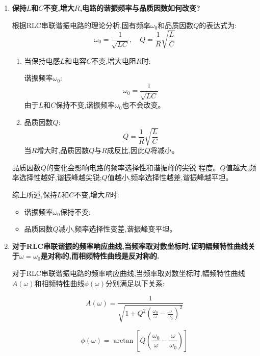\documentclass[UTF8]{ctexart}
\begin{document}
\begin{enumerate}
    \item \textbf{保持$L$和$C$不变,增大$R$,电路的谐振频率与品质因数如何改变?}
    
    根据RLC串联谐振电路的理论分析,固有频率$\omega_0$和品质因数$Q$的表达式为:
    \begin{equation}
    \omega_0 = \frac{1}{\sqrt{LC}}, \quad Q = \frac{1}{R}\sqrt{\frac{L}{C}}
    \end{equation}
    \begin{enumerate}
    \item 当保持电感$L$和电容$C$不变,增大电阻$R$时:

    谐振频率$\omega_0$:
    \begin{equation}
    \omega_0 = \frac{1}{\sqrt{LC}}
    \end{equation}
    由于$L$和$C$保持不变,谐振频率$\omega_0$也不会改变。

    \item 品质因数$Q$:
    \begin{equation}
    Q = \frac{1}{R}\sqrt{\frac{L}{C}}
    \end{equation}
    当$R$增大时,品质因数$Q$与$R$成反比,因此$Q$将减小。
    \end{enumerate}
    品质因数$Q$的变化会影响电路的频率选择性和谐振峰的尖锐  程度。$Q$值越大,频率选择性越好,谐振峰越尖锐;$Q$值越小,频率选择性越差,谐振峰越平坦。

    综上所述,保持$L$和$C$不变,增大$R$时:
    \begin{itemize}
    \item 谐振频率$\omega_0$保持不变;
    \item 品质因数$Q$减小,频率选择性变差,谐振峰变平坦。
    \end{itemize}
    
    \item \textbf{对于RLC串联谐振的频率响应曲线,当频率取对数坐标时,证明幅频特性曲线关于$\omega=\omega_0$是对称的,而相频特性曲线是反对称的.}
    
    对于RLC串联谐振电路的频率响应曲线,当频率取对数坐标时,幅频特性曲线$A(\omega)$和相频特性曲线$\phi(\omega)$分别满足以下关系:

\begin{equation}
A(\omega) = \frac{1}{\sqrt{1 + Q^2(\frac{\omega_0}{\omega} - \frac{\omega}{\omega_0})^2}}
\end{equation}

\begin{equation}
\phi(\omega) = \arctan\left[Q\left(\frac{\omega_0}{\omega} - \frac{\omega}{\omega_0}\right)\right]
\end{equation}


\end{enumerate}
\end{document}
